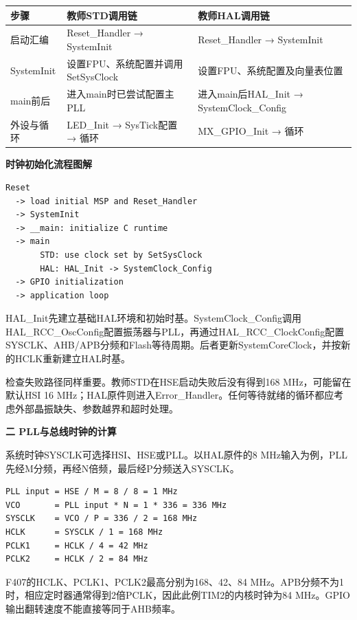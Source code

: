 \documentclass[10pt,a4paper]{article}
\newcommand{\qtitle}[1]{{\Large\bfseries #1}\par\vspace{4pt}}
\newcommand{\qsub}[1]{{\bfseries #1}\par}
\begin{document}
\begingroup\small
\begin{tabularx}{\linewidth}{|>{\hsize}Y|>{\hsize}Y|>{\hsize}Y|}\hline
{}
\textbf{步骤} & \textbf{教师STD调用链} & \textbf{教师HAL调用链} \\ \hline
启动汇编 & Reset\_\allowbreak{}Handler → SystemInit & Reset\_\allowbreak{}Handler → SystemInit \\ \hline
SystemInit & 设置FPU、系统配置并调用SetSysClock & 设置FPU、系统配置及向量表位置 \\ \hline
main前后 & 进入main时已尝试配置主PLL & 进入main后HAL\_\allowbreak{}Init → SystemClock\_\allowbreak{}Config \\ \hline
外设与循环 & LED\_\allowbreak{}Init → SysTick配置 → 循环 & MX\_\allowbreak{}GPIO\_\allowbreak{}Init → 循环 \\ \hline
\end{tabularx}
\endgroup\par
\qsub{时钟初始化流程图解}
\begin{Verbatim}[fontsize=\scriptsize,breaklines=true]
Reset
  -> load initial MSP and Reset_Handler
  -> SystemInit
  -> __main: initialize C runtime
  -> main
       STD: use clock set by SetSysClock
       HAL: HAL_Init -> SystemClock_Config
  -> GPIO initialization
  -> application loop
\end{Verbatim}
HAL\_\allowbreak{}Init先建立基础HAL环境和初始时基。SystemClock\_\allowbreak{}Config调用HAL\_\allowbreak{}RCC\_\allowbreak{}OscConfig配置振荡器与PLL，再通过HAL\_\allowbreak{}RCC\_\allowbreak{}ClockConfig配置SYSCLK、AHB/\allowbreak{}APB分频和Flash等待周期。后者更新SystemCoreClock，并按新的HCLK重新建立HAL时基。

检查失败路径同样重要。教师STD在HSE启动失败后没有得到168 MHz，可能留在默认HSI 16 MHz；HAL原件则进入Error\_\allowbreak{}Handler。任何等待就绪的循环都应考虑外部晶振缺失、参数越界和超时处理。


\clearpage
{}
\qtitle{二 PLL与总线时钟的计算}
系统时钟SYSCLK可选择HSI、HSE或PLL。以HAL原件的8 MHz输入为例，PLL先经M分频，再经N倍频，最后经P分频送入SYSCLK。

\begin{Verbatim}[fontsize=\scriptsize,breaklines=true]
PLL input = HSE / M = 8 / 8 = 1 MHz
VCO       = PLL input * N = 1 * 336 = 336 MHz
SYSCLK    = VCO / P = 336 / 2 = 168 MHz
HCLK      = SYSCLK / 1 = 168 MHz
PCLK1     = HCLK / 4 = 42 MHz
PCLK2     = HCLK / 2 = 84 MHz
\end{Verbatim}
F407的HCLK、PCLK1、PCLK2最高分别为168、42、84 MHz。APB分频不为1时，相应定时器通常得到2倍PCLK，因此此例TIM2的内核时钟为84 MHz。GPIO输出翻转速度不能直接等同于AHB频率。
\end{document}
